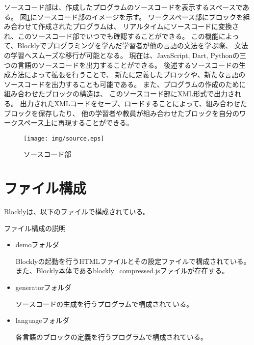 \documentclass{risepaper}
\begin{document}
ソースコード部は、作成したプログラムのソースコードを表示するスペースである。
図\ref{fig:source}にソースコード部のイメージを示す。
ワークスペース部にブロックを組み合わせて作成されたプログラムは、
リアルタイムにソースコードに変換され、このソースコード部でいつでも確認することができる。
この機能によって、Blocklyでプログラミングを学んだ学習者が他の言語の文法を学ぶ際、
文法の学習へスムーズな移行が可能となる。
現在は、JavaScript, Dart, Pythonの三つの言語のソースコードを出力することができる。
後述するソースコードの生成方法によって拡張を行うことで、
新たに定義したブロックや、新たな言語のソースコードを出力することも可能である。
また、プログラムの作成のために組み合わせたブロックの構造は、
このソースコード部にXML形式で出力される。
出力されたXMLコードをセーブ、ロードすることによって、組み合わせたブロックを保存したり、
他の学習者や教員が組み合わせたブロックを自分のワークスペース上に再現することができる。

\newpage

\begin{figure}[h]
\begin{center}
\texttt{[image: img/source.eps]}
\end{center}%
\caption{ソースコード部}%
\label{fig:source}
\end{figure}%

\section{ファイル構成}

Blocklyは、以下のファイルで構成されている。

ファイル構成の説明

\begin{itemize}
\item demoフォルダ

Blocklyの起動を行うHTMLファイルとその設定ファイルで構成されている。
また、Blockly本体であるblockly\_compressed.jsファイルが存在する。

\end{itemize}

\begin{itemize}
\item generatorフォルダ

ソースコードの生成を行うプログラムで構成されている。

\end{itemize}

\begin{itemize}
\item languageフォルダ

各言語のブロックの定義を行うプログラムで構成されている。

\end{itemize}
\end{document}
